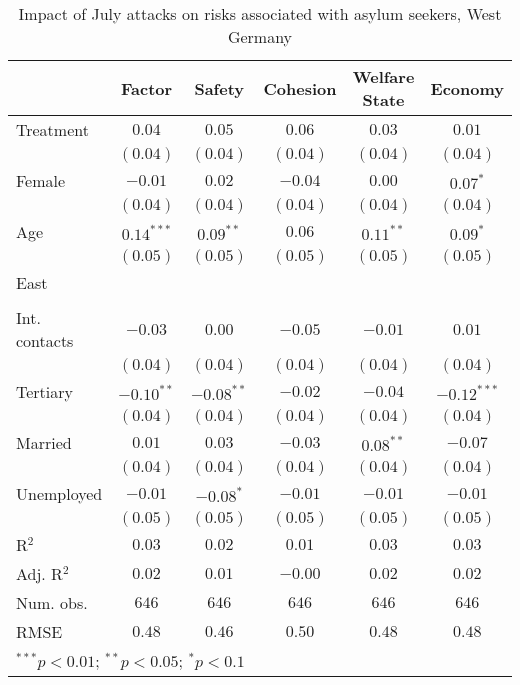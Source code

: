 
\begin{table}
\caption{Impact of July attacks on risks associated with asylum seekers, West Germany}
\begin{center}
\begin{tabular}{l c c c c c}
\toprule
 & Factor & Safety & Cohesion & Welfare State & Economy \\
\midrule
Treatment     & $0.04$       & $0.05$       & $0.06$   & $0.03$      & $0.01$        \\
              & $(0.04)$     & $(0.04)$     & $(0.04)$ & $(0.04)$    & $(0.04)$      \\
Female        & $-0.01$      & $0.02$       & $-0.04$  & $0.00$      & $0.07^{*}$    \\
              & $(0.04)$     & $(0.04)$     & $(0.04)$ & $(0.04)$    & $(0.04)$      \\
Age           & $0.14^{***}$ & $0.09^{**}$  & $0.06$   & $0.11^{**}$ & $0.09^{*}$    \\
              & $(0.05)$     & $(0.05)$     & $(0.05)$ & $(0.05)$    & $(0.05)$      \\
East          &              &              &          &             &               \\
              &              &              &          &             &               \\
Int. contacts & $-0.03$      & $0.00$       & $-0.05$  & $-0.01$     & $0.01$        \\
              & $(0.04)$     & $(0.04)$     & $(0.04)$ & $(0.04)$    & $(0.04)$      \\
Tertiary      & $-0.10^{**}$ & $-0.08^{**}$ & $-0.02$  & $-0.04$     & $-0.12^{***}$ \\
              & $(0.04)$     & $(0.04)$     & $(0.04)$ & $(0.04)$    & $(0.04)$      \\
Married       & $0.01$       & $0.03$       & $-0.03$  & $0.08^{**}$ & $-0.07$       \\
              & $(0.04)$     & $(0.04)$     & $(0.04)$ & $(0.04)$    & $(0.04)$      \\
Unemployed    & $-0.01$      & $-0.08^{*}$  & $-0.01$  & $-0.01$     & $-0.01$       \\
              & $(0.05)$     & $(0.05)$     & $(0.05)$ & $(0.05)$    & $(0.05)$      \\
\midrule
R$^2$         & $0.03$       & $0.02$       & $0.01$   & $0.03$      & $0.03$        \\
Adj. R$^2$    & $0.02$       & $0.01$       & $-0.00$  & $0.02$      & $0.02$        \\
Num. obs.     & $646$        & $646$        & $646$    & $646$       & $646$         \\
RMSE          & $0.48$       & $0.46$       & $0.50$   & $0.48$      & $0.48$        \\
\bottomrule
\multicolumn{6}{l}{\scriptsize{$^{***}p<0.01$; $^{**}p<0.05$; $^{*}p<0.1$}}
\end{tabular}
\label{tab_risk_west}
\end{center}
\end{table}
